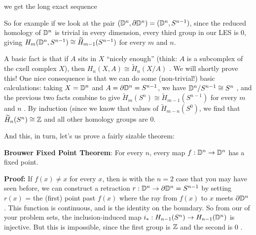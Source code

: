 
we get the
long exact sequence 

\ssk


\msk

So for example if we look at the pair $({\Bbb D}^n,\partial {\Bbb D}^n) = ({\Bbb D}^n,S^{n-1})$,
since the reduced homology of ${\Bbb D}^n$ is trivial in every dimension, every third group in
our LES is $0$, giving $H_m({\Bbb D}^n,S^{n-1})\cong  \widetilde{H}_{m-1}(S^{n-1})$ for every $m$ and $n$.

\ssk

A basic fact is that if $A$ sits in $X$ ``nicely enough'' (think: $A$ is a subcomplex of the cxell complex $X$),
then $H_n(X,A) \cong \widetilde{H}_n(X/A)$ . We will shortly prove this! One nice consequence is
that we can do some (non-trivial!) basic calculations: taking $X={\Bbb D}^n$ and $A=\partial {\Bbb D}^n = S^{n-1}$,
we have ${\Bbb D}^n/S^{n-1} \cong S^n$ ,  and the previous two facts combine to give
$ \widetilde{H}_{m}(S^{n}) \cong  \widetilde{H}_{m-1}(S^{n-1})$ for every $m$ and $n$ . By induction (since we
know that values of $ \widetilde{H}_{m-n}(S^0)$, we find that $ \widetilde{H}_n(S^n)\cong {\Bbb Z}$ and all 
other homology groups are $0$.

\msk

And this, in turn, let's us prove a fairly sizable theorem:

\ssk

{\bf Brouwer Fixed Point Theorem}: For every $n$, every
map $f:{\Bbb D}^n\rightarrow {\Bbb D}^n$ has a fixed point.

\ssk

{\bf Proof:} If $f(x)\neq x$ for every $x$, then is with the $n=2$ case
that you may have seen before, we can construct a retraction
$r:{\Bbb D}^n \rightarrow \partial {\Bbb D}^n = S^{n-1}$ by setting
$r(x)$ = the (first) point past $f(x)$ where the ray from $f(x)$ to $x$ meets
$\partial {\Bbb D}^n$ . This function is continuous, and is the 
identity on the boundary. So from our of your problem sets, the 
inclusion-induced map $i_*: H_{n-1}(S^n) \rightarrow H_{n-1}({\Bbb D}^n)$ 
is injective. But this is impossible, since the first group is ${\Bbb Z}$ and the
second is $0$ .

\bsk

